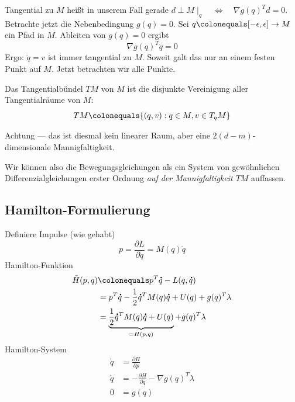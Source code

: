 Tangential zu $M$ heißt in unserem Fall gerade $d \perp M \mid_q \quad \Leftrightarrow \quad \nabla g(q)^T d = 0$.
Betrachte jetzt die Nebenbedingung $g(q) = 0$. 
Sei $q \colonequals [-\epsilon, \epsilon] \rightarrow M$ ein Pfad in $M$. Ableiten von $g(q) = 0$ ergibt
\begin{equation*}
	\nabla g(q)^T \dot{q} = 0
\end{equation*}
Ergo: $\dot{q} = v$ ist immer tangential zu $M$. Soweit galt das nur an einem festen Punkt auf $M$. Jetzt betrachten wir alle Punkte.

\begin{definition}
	Das Tangentialbündel $TM$ von $M$ ist die disjunkte Vereinigung aller Tangentialräume von $M$:
	\begin{equation*}
	TM \colonequals \{ (q,v) : q \in M, v \in T_q M\}
	\end{equation*}
\end{definition}

Achtung --- das ist diesmal kein linearer Raum, aber eine $2(d-m)$-dimensionale Mannigfaltigkeit.

Wir können also die Bewegungsgleichungen als ein System von gewöhnlichen Differenzialgleichungen erster Ordnung \textit{auf der Mannigfaltigkeit $TM$} auffassen.

\subsection*{Hamilton-Formulierung}

Definiere Impulse (wie gehabt)
\begin{equation*}
	p = \frac{\partial L}{\partial \dot{q}} = M(q) \dot{q}
\end{equation*}
Hamilton-Funktion
\begin{align*}
	\tilde H(p,q) & \colonequals  p^T \dot{q} - L(q,\dot{q})
	\\
	& = p^T \dot{q} - \frac{1}{2} \dot{q}^T M(q) \dot{q} + U(q) + g(q)^T \lambda
	\\
	& = \underbrace{\frac{1}{2} \dot{q}^T M(q) \dot{q} + U(q)}_{= H (p,q)} + g(q)^T \lambda
\end{align*}
Hamilton-System
\begin{align*}
	\dot{q} & = \frac{\partial H}{\partial p}
	\\
	\dot{q} & = - \frac{\partial H}{\partial q} - \nabla g(q)^T \lambda
	\\
	0 & = g(q)
\end{align*}

